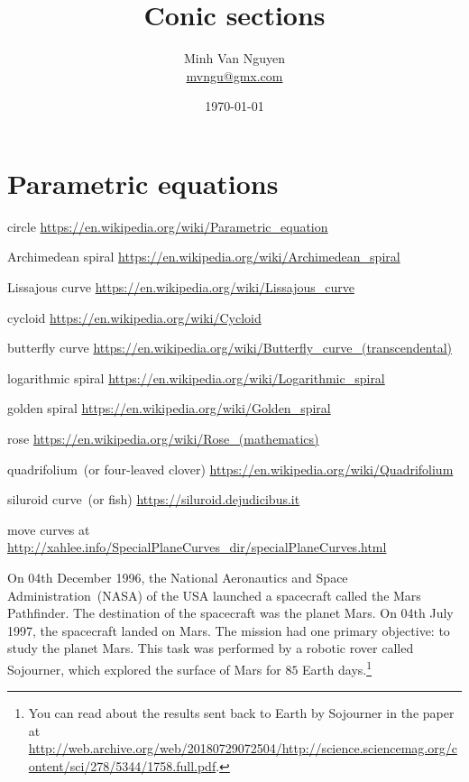 \documentclass[a4paper,oneside,12pt]{article}
\begin{document}
\title{\Large\bf Conic sections}
\author{%
  Minh Van Nguyen \\
  \url{mvngu@gmx.com}
}
\date{\today}
\maketitle



\section{Parametric equations}

{\color{red}
\begin{packeditem}
\item circle
  \url{https://en.wikipedia.org/wiki/Parametric_equation}

\item Archimedean spiral
  \url{https://en.wikipedia.org/wiki/Archimedean_spiral}

\item Lissajous curve
  \url{https://en.wikipedia.org/wiki/Lissajous_curve}

\item cycloid
  \url{https://en.wikipedia.org/wiki/Cycloid}

\item butterfly curve
  \url{https://en.wikipedia.org/wiki/Butterfly_curve_(transcendental)}

\item logarithmic spiral
  \url{https://en.wikipedia.org/wiki/Logarithmic_spiral}

\item golden spiral
  \url{https://en.wikipedia.org/wiki/Golden_spiral}

\item rose
  \url{https://en.wikipedia.org/wiki/Rose_(mathematics)}

\item quadrifolium~(or four-leaved clover)
  \url{https://en.wikipedia.org/wiki/Quadrifolium}

\item siluroid curve~(or fish)
  \url{https://siluroid.dejudicibus.it}

\item move curves at
  \url{http://xahlee.info/SpecialPlaneCurves_dir/specialPlaneCurves.html}
\end{packeditem}
}

On 04th December 1996, the National Aeronautics and Space
Administration~(NASA) of the USA launched a spacecraft called the Mars
Pathfinder.  The destination of the spacecraft was the planet Mars.
On 04th July 1997, the spacecraft landed on Mars.  The mission had one
primary objective: to study the planet Mars.  This task was performed
by a robotic rover called Sojourner, which explored the surface of
Mars for $85$ Earth days.\footnote{
  You can read about the results sent back to Earth by Sojourner in
  the paper at
  \url{http://web.archive.org/web/20180729072504/http://science.sciencemag.org/content/sci/278/5344/1758.full.pdf}.
}
\end{document}
